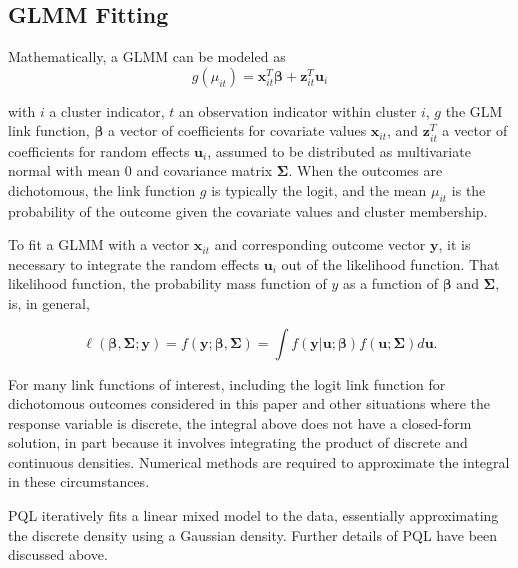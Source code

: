 \documentclass{article}
\begin{document}
\begin{flushleft}
\appendix
\section{GLMM Fitting}
Mathematically, a GLMM can be modeled as
    \begin{equation}
        g(\mu_{it})=\mathbf{x}^T_{it} \boldsymbol{\beta} + \mathbf{z}^T_{it}\mathbf{u}_i
    \end{equation}
    
    with
 $i$ a cluster indicator, $t$ an observation indicator within cluster $i$, $g$ the GLM link function, $\boldsymbol{\beta}$ a vector of coefficients for covariate values $\mathbf{x}_{it}$, and $\mathbf{z}^T_{it}$ a vector of coefficients for random effects $\mathbf{u}_i$, assumed to be distributed as multivariate normal with mean $0$ and covariance matrix $\mathbf{\Sigma}$. When the outcomes are dichotomous, the link function $g$ is typically the logit, and the mean $\mu_{it}$ is the probability of the outcome given the covariate values and cluster membership.
 
To fit a GLMM with a vector $\mathbf{x}_{it}$ and corresponding outcome vector $\mathbf{y}$, it is necessary to integrate the random effects $\mathbf{u}_i$ out of the likelihood function\cite{rodriguez_assessment_1995}. That likelihood function, the probability mass function of $y$ as a function of $\boldsymbol{\beta}$ and $\mathbf{\Sigma}$\cite{agresti_categorical_2013}, is, in general,

\begin{equation}
 \ell(\boldsymbol{\beta}, \mathbf{\Sigma} ; \mathbf{y})=f(\mathbf{y};\boldsymbol{\beta}, \mathbf{\Sigma})=\int f(\mathbf{y}|\mathbf{u};\boldsymbol{\beta})f(\mathbf{u}; \mathbf{\Sigma})d\mathbf{u}.   
\end{equation}

For many link functions of interest, including the logit link function for dichotomous outcomes considered in this paper and other situations where the response variable is discrete, the integral above does not have a closed-form solution, in part because it involves integrating the product of discrete and continuous densities\cite{ng_estimation_2006}. Numerical methods are required to approximate the integral in these circumstances.

PQL iteratively fits a linear mixed model\cite{lin_bias_1996} to the data, essentially approximating the discrete density using a Gaussian density\cite{ng_estimation_2006}. Further details of PQL have been discussed above.


\end{flushleft}
\end{document}
